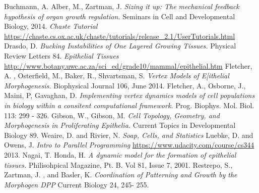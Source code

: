 \begin{thebibliography}{1}
 Buchmann, A. Alber, M., Zartman, J. \emph{ Sizing it up: The mechanical feedback hypothesis of organ growth regulation.} Seminars in Cell and Developmental Biology, 2014.
 \emph{Chaste Tutorial} \url{https://chaste.cs.ox.ac.uk/chaste/tutorials/release_2.1/UserTutorials.html}
 Drasdo, D. \emph{Bucking Instabilities of One Layered Growing Tissues.} Physical Review Letters 84.
\emph{Epithelial Tissues} \url{http://www.botany.uwc.ac.za/sci_ed/grade10/mammal/epithelial.htm}
 Fletcher, A. , Osterfield, M., Baker, R., Shvartsman, S. \emph{Vertex Models of E[ithelial Morphogenesis.} Biophysical Journal 106, June 2014.
 Fletcher, A., Osborne, J., Maini, P, Gavaghan, D. \emph{Implementing vertex dynamics models of cell populations in biology within a consitent computational framework.} Prog. Biophys. Mol. Biol. 113: 299 - 326.
 Gibson, W., Gibson, M. \emph{Cell Topology, Geometry, and Morphogenesis  in Proliferating Epithelia.} Current Topics in Developmental Biology 89.
 Weaire, D. and Rivier, N. \emph{Soap, Cells, and Statistics}
 Luebke, D. and Owens, J. \emph{Intro to Parallel Programming} \url{https://www.udacity.com/course/cs344} 2013.
 Nagai, T. Honda, H. \emph{A dynamic model for the formation of epithelial tissues.} Philisohpical Magazine, Pt. B. Vol 81, Issue 7, 2001.
 Restrepo, S., Zartman, J. , and Basler, K. \emph{ Coordination of Patterning and Growth by the Morphogen DPP} Current Biology 24, 245- 255.

\end{thebibliography}